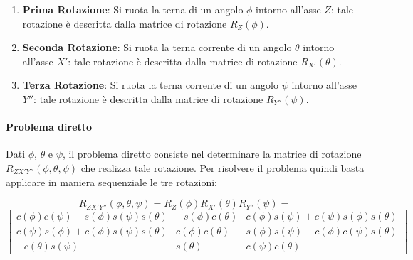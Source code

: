 ﻿\documentclass[11pt, a4paper]{article}
\begin{document}
\begin{enumerate}
    \item \textbf{Prima Rotazione}: Si ruota la terna di un angolo $\phi$ intorno all'asse $Z$: tale rotazione è descritta dalla matrice di rotazione $R_Z(\phi)$.
    \item \textbf{Seconda Rotazione}: Si ruota la terna corrente di un angolo $\theta$ intorno all'asse $X'$: tale rotazione è descritta dalla matrice di rotazione $R_{X'}(\theta)$.
    \item \textbf{Terza Rotazione}: Si ruota la terna corrente di un angolo $\psi$ intorno all'asse $Y''$: tale rotazione è descritta dalla matrice di rotazione $R_{Y''}(\psi)$.
\end{enumerate}

\paragraph{Problema diretto}

Dati $\phi$, $\theta$ e $\psi$, il problema diretto consiste nel determinare la matrice di rotazione $R_{ZX'Y''}(\phi, \theta, \psi)$ che realizza tale rotazione. Per risolvere il problema quindi basta applicare in maniera sequenziale le tre rotazioni:

\[
    R_{ZX'Y''}(\phi, \theta, \psi) = R_Z(\phi) R_{X'}(\theta) R_{Y''}(\psi) =
\]
\[
\begin{bmatrix}
    c(\phi)c(\psi) - s(\phi)s(\psi)s(\theta) & -s(\phi)c(\theta) & c(\phi)s(\psi) + c(\psi)s(\phi)s(\theta) \\
    c(\psi)s(\phi) + c(\phi)s(\psi)s(\theta) & c(\phi)c(\theta) & s(\phi)s(\psi) - c(\phi)c(\psi)s(\theta) \\
    -c(\theta)s(\psi) & s(\theta) & c(\psi)c(\theta)
\end{bmatrix}
\]
\end{document}
